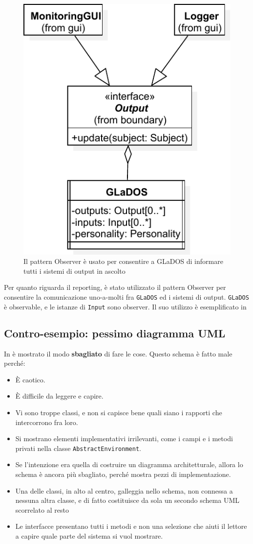 \begin{figure}[h]
	\centering{}
	\includegraphics[width=.7\textwidth]{img/observer}
	\caption{Il pattern Observer è usato per consentire a GLaDOS di informare tutti i sistemi di output in ascolto}
	\label{img:observer}
\end{figure}

Per quanto riguarda il reporting, è stato utilizzato il pattern Observer per consentire la
comunicazione uno-a-molti fra \texttt{GLaDOS} ed i sistemi di output.
%
\texttt{GLaDOS} è observable, e le istanze di \texttt{Input} sono observer.
%
Il suo utilizzo è esemplificato in 

\subsection*{Contro-esempio: pessimo diagramma UML}

In  è mostrato il modo \textbf{sbagliato} di fare le cose.
%
Questo schema è fatto male perché:
\begin{itemize}
	\item È caotico.
	\item È difficile da leggere e capire.
	\item Vi sono troppe classi, e non si capisce bene quali siano i rapporti che intercorrono fra loro.
	\item Si mostrano elementi implementativi irrilevanti, come i campi e i metodi privati nella classe \texttt{AbstractEnvironment}.
	\item Se l'intenzione era quella di costruire un diagramma architetturale, allora lo schema è ancora più sbagliato, perché mostra pezzi di implementazione.
	\item Una delle classi, in alto al centro, galleggia nello schema, non connessa a nessuna altra classe, e di fatto costituisce da sola un secondo schema UML scorrelato al resto
	\item Le interfacce presentano tutti i metodi e non una selezione che aiuti il lettore a capire quale parte del sistema si vuol mostrare.
\end{itemize}


